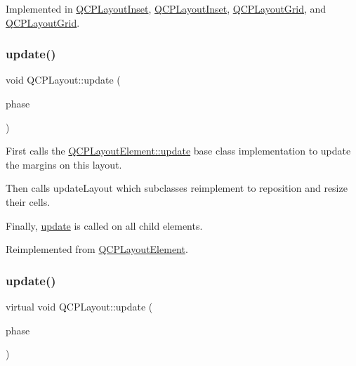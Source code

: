 Implemented in \hyperlink{class_q_c_p_layout_inset_abf2e8233f5b7051220907e62ded490a2}{Q\+C\+P\+Layout\+Inset}, \hyperlink{class_q_c_p_layout_inset_ac95e930d304c7f07d9948f35172a396a}{Q\+C\+P\+Layout\+Inset}, \hyperlink{class_q_c_p_layout_grid_a17dd220234d1bbf8835abcc666384d45}{Q\+C\+P\+Layout\+Grid}, and \hyperlink{class_q_c_p_layout_grid_a6c649e95e9550f671ca130d7ebc97feb}{Q\+C\+P\+Layout\+Grid}.

\mbox{\label{class_q_c_p_layout_a48ecc9c98ea90b547c3e27a931a8f7bd}} 
\subsubsection{\texorpdfstring{update()}{update()}\hspace{0.1cm}{\footnotesize\ttfamily [1/2]}}
{\footnotesize\ttfamily void Q\+C\+P\+Layout\+::update (\begin{DoxyParamCaption}\item[{\hyperlink{class_q_c_p_layout_element_a0d83360e05735735aaf6d7983c56374d}{Update\+Phase}}]{phase }\end{DoxyParamCaption})\hspace{0.3cm}{\ttfamily [virtual]}}

First calls the \hyperlink{class_q_c_p_layout_element_a929c2ec62e0e0e1d8418eaa802e2af9b}{Q\+C\+P\+Layout\+Element\+::update} base class implementation to update the margins on this layout.

Then calls update\+Layout which subclasses reimplement to reposition and resize their cells.

Finally, \hyperlink{class_q_c_p_layout_a48ecc9c98ea90b547c3e27a931a8f7bd}{update} is called on all child elements. 

Reimplemented from \hyperlink{class_q_c_p_layout_element_a929c2ec62e0e0e1d8418eaa802e2af9b}{Q\+C\+P\+Layout\+Element}.

\mbox{\label{class_q_c_p_layout_a2dd1945e29217de03f27228f596d1304}} 
\subsubsection{\texorpdfstring{update()}{update()}\hspace{0.1cm}{\footnotesize\ttfamily [2/2]}}
{\footnotesize\ttfamily virtual void Q\+C\+P\+Layout\+::update (\begin{DoxyParamCaption}\item[{\hyperlink{class_q_c_p_layout_element_a0d83360e05735735aaf6d7983c56374d}{Update\+Phase}}]{phase }\end{DoxyParamCaption})\hspace{0.3cm}{\ttfamily [virtual]}}


